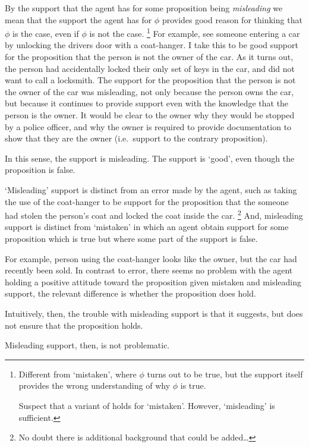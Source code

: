 \begin{note}
  By the support that the agent has for some proposition being \emph{misleading} we mean that the support the agent has for \(\phi\) provides good reason for thinking that \(\phi\) is the case, even if \(\phi\) is not the case.\nolinebreak
  \footnote{
    Different from `mistaken', where \(\phi\) turns out to be true, but the support itself provides the wrong understanding of why \(\phi\) is true.

    Suspect that a variant of \nI{} holds for `mistaken'.
    However, `misleading' is sufficient.
  }
  For example, see someone entering a car by unlocking the drivers door with a coat-hanger.
  I take this to be good support for the proposition that the person is not the owner of the car.
  As it turns out, the person had accidentally locked their only set of keys in the car, and did not want to call a locksmith.
  The support for the proposition that the person is not the owner of the car was misleading, not only because the person owns the car, but because it continues to provide support even with the knowledge that the person is the owner.
  It would be clear to the owner why they would be stopped by a police officer, and why the owner is required to provide documentation to show that they are the owner (i.e.\ support to the contrary proposition).

  In this sense, the support is misleading.
  The support is `good', even though the proposition is false.

  `Misleading' support is distinct from an error made by the agent, such as taking the use of the coat-hanger to be support for the proposition that the someone had stolen the person's coat and locked the coat inside the car.\nolinebreak
  \footnote{
    No doubt there is additional background that could be added\dots
  }
  And, misleading support is distinct from `mistaken' in which an agent obtain support for some proposition which is true but where some part of the support is false.

  For example, person using the coat-hanger looks like the owner, but the car had recently been sold.
  In contrast to error, there seems no problem with the agent holding a positive attitude toward the proposition given mistaken and misleading support, the relevant difference is whether the proposition does hold.

  Intuitively, then, the trouble with misleading support is that it suggests, but does not ensure that the proposition holds.

  Misleading support, then, is not problematic.
\end{note}


